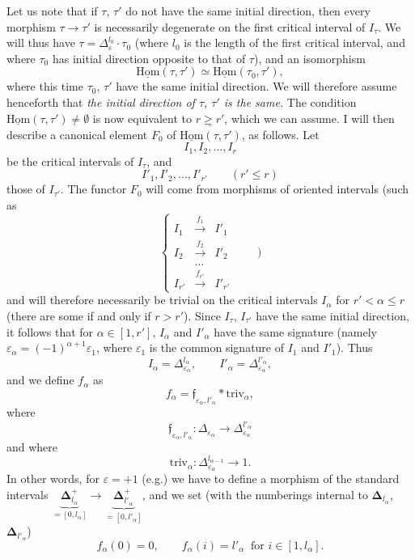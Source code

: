 \documentclass[11pt]{article}
\newcommand{\msp}[1]{\marginpar{\footnotesize [#1]}}
\newcommand{\uHom}{\underline{\mathrm{Hom}}}
\newcommand{\triv}{\mathrm{triv}}
\begin{document}
Let us note that if $\tau$, $\tau'$ do not have the same initial direction, then every morphism $\tau\longrightarrow\tau'$ is necessarily degenerate on the first critical interval of $I_\tau$. We will thus have $\tau=\Delta_\varepsilon^{l_0}\cdot\tau_0$ (where $l_0$ is the length of the first critical interval, and where $\tau_0$ has initial direction opposite to that of $\tau$), and an isomorphism
\[
\uHom(\tau,\tau')\simeq\uHom(\tau_0,\tau'),
\]
where this time $\tau_0$, $\tau'$ have the same initial direction. We will therefore assume henceforth that \textit{the initial direction of $\tau$, $\tau'$ is the same.} The condition $\uHom(\tau,\tau')\neq\emptyset$ is now equivalent to $\underline{r\geq r'}$, which we can assume. I will then describe a canonical element
\msp{page 85}
$F_0$ of $\uHom(\tau,\tau')$, as follows. Let
\[
I_1,I_2,\dots,I_r
\]
be the critical intervals of $I_\tau$, and
\[
I'_1,I'_2,\dots,I'_{r'}\qquad(r'\leq r)
\]
those of $I_{\tau'}$. The functor $F_0$ will come from morphisms of oriented intervals (such as
\[
\left\{
\begin{array}{ccc}
I_1 & \xrightarrow{f_1} & I'_1\\[4pt]
I_2 & \xrightarrow{f_2} & I'_2\\[4pt]
 & \dots & \\[4pt]
I_{r'} & \xrightarrow{f_{r'}} & I'_{r'}
\end{array}
\right.\qquad)
\]
and will therefore necessarily be trivial on the critical intervals $I_\alpha$ for $r'<\alpha\leq r$ (there are some if and only if $r>r'$). Since $I_\tau$, $I_{\tau'}$ have the same initial direction, it follows that for $\alpha\in[1,r']$, $I_\alpha$ and $I'_\alpha$ have the same signature (namely $\varepsilon_\alpha=(-1)^{\alpha+1}\varepsilon_1$, where $\varepsilon_1$ is the common signature of $I_1$ and $I'_1$). Thus
\[
I_\alpha=\Delta^{l_\alpha}_{\varepsilon_\alpha},\qquad I'_\alpha=\Delta^{l'_\alpha}_{\varepsilon_\alpha},
\]
and we define $f_\alpha$ as
\[
f_\alpha=\mathfrak{f}_{\varepsilon_\alpha,l'_\alpha}*\triv_\alpha,
\]
where
\[
\mathfrak{f}_{\varepsilon_\alpha,l'_\alpha}:\Delta_{\varepsilon_\alpha}\longrightarrow\Delta^{l'_\alpha}_{\varepsilon_\alpha}
\]
and where
\[
\triv_\alpha:\Delta^{l_{\alpha-1}}_{\varepsilon_\alpha}\longrightarrow1. %
\]
In other words, for $\varepsilon=+1$ (e.g.) we have to define a morphism of the standard intervals $\underbrace{\mathbf{\Delta}^+_{l_\alpha}}_{=[0,l_\alpha]}\longrightarrow\underbrace{\mathbf{\Delta}^+_{l'_\alpha}}_{=[0,l'_\alpha]}$, and we set (with the numberings internal to $\mathbf{\Delta}_{l_\alpha}$, $\mathbf{\Delta}_{l'_\alpha}$)
\[
f_\alpha(0)=0,\qquad f_\alpha(i)=l'_\alpha\ \text{ for }i\in[1,l_\alpha].
\]
\end{document}
